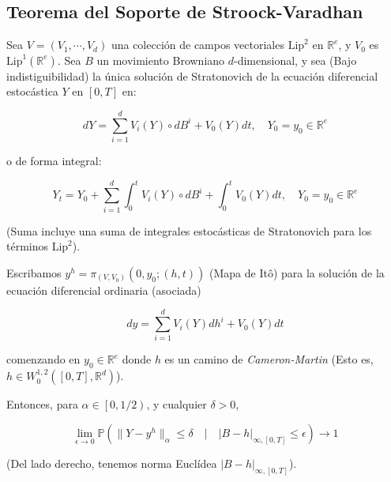 \subsection{Teorema del Soporte de Stroock-Varadhan}




\begin{theorem}
	Sea $V = \left( V_1, \cdots, V_d \right)$ una colección de campos vectoriales $\text{Lip}^2$ en $\mathbb{R}^e$, y $V_0$ es $\text{Lip}^1 (\mathbb{R}^e)$. Sea $B$ un movimiento Browniano $d$-dimensional, y sea (Bajo indistiguibilidad) la única solución de Stratonovich de la ecuación diferencial estocástica $Y$ en $[0,T]$ en:

	\[
		dY = \sum_{i = 1}^d V_i(Y) \circ dB^i + V_0 (Y) dt, \quad Y_0 = y_0 \in \mathbb{R}^e
	\]

	o de forma integral:

	\[
		Y_t = Y_0 + \sum_{i = 1}^d  \int_0^t V_i(Y) \circ dB^i + \int_0^t V_0 (Y) dt, \quad Y_0 = y_0 \in \mathbb{R}^e
	\]

	(Suma incluye una suma de integrales estocásticas de Stratonovich para los términos $\text{Lip}^2$).

	Escribamos $y^h = \pi_{(V, V_0)} (0, y_0; (h,t))$ (Mapa de Itô) para la solución de la ecuación diferencial ordinaria (asociada)

	\[
		dy = \sum_{i = 1}^d V_i (Y) dh^i + V_0 (Y) dt
	\]

	comenzando en $y_0 \in \mathbb{R}^e$ donde $h$ es un camino de \textit{Cameron-Martin} (Esto es, $h \in W_0^{1,2} ([0,T], \mathbb{R}^d)$).

	Entonces, para $\alpha \in \left[ 0, 1/2 \right)$, y cualquier $\delta > 0$,

	\[
		\lim_{\epsilon \rightarrow 0} \mathbb{P} \left( \lVert Y - y^h \rVert_{ \alpha }  \leq \delta \quad \vert \quad \lvert B - h \rvert_{\infty, [0,T]}  \leq \epsilon \right) \rightarrow 1
	\]

	(Del lado derecho, tenemos norma Euclídea $\lvert B - h \rvert_{\infty, [0,T]} $).

\end{theorem}

